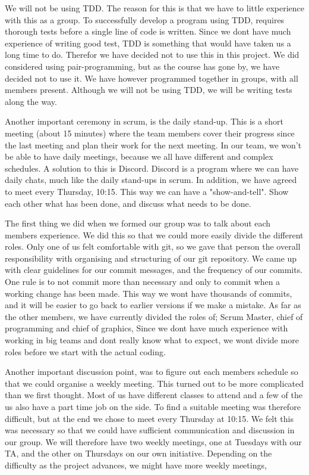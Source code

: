 \documentclass{article}
\begin{document}
We will not be using TDD. The reason for this is that we have to little experience with this as a group. To successfully develop a program using TDD, requires thorough tests before a single line of code is written. Since we dont have much experience of writing good test, TDD is something that would have taken us a long time to do. Therefor we have decided not to use this in this project. We did considered using pair-programming, but as the course has gone by, we have decided not to use it. We have however programmed together in groups, with all members present. Although we will not be using TDD, we will be writing tests along the way.
\newline

Another important ceremony in scrum, is the daily stand-up. This is a short meeting (about 15 minutes) where the team members cover their progress since the last meeting and plan their work for the next meeting. In our team, we won't be able to have daily meetings, because we all have different and complex schedules. A solution to this is Discord. Discord is a program where we can have daily chats, much like the daily stand-ups in scrum. In addition, we have agreed to meet every Thursday, 10:15. This way we can have a "show-and-tell". Show each other what has been done, and discuss what needs to be done.
\newline

The first thing we did when we formed our group was to talk about each members experience. We did this so that we could more easily divide the different roles. Only one of us felt comfortable with git, so we gave that person the overall responsibility with organising and structuring of our git repository. We came up with clear guidelines for our commit messages, and the frequency of our commits. One rule is to not commit more than necessary and only to commit when a working change has been made. This way we wont have thousands of commits, and it will be easier to go back to earlier versions if we make a mistake. As far as the other members, we have currently divided the roles of; Scrum Master, chief of programming and chief of graphics, Since we dont have much experience with working in big teams and dont really know what to expect, we wont divide more roles before we start with the actual coding. \newline

Another important discussion point, was to figure out each members schedule so that we could organise a weekly meeting. This turned out to be more complicated than we first thought. Most of us have different classes to attend and a few of the us also have a part time job on the side. To find a suitable meeting was therefore  difficult, but at the end we chose to meet every Thursday at 10:15. We felt this was necessary so that we could have sufficient communication and discussion in our group. We will therefore have two weekly meetings, one at Tuesdays with our TA, and the other on Thursdays on our own initiative. Depending on the difficulty as the project advances, we might have more weekly meetings,  \newline
\end{document}
